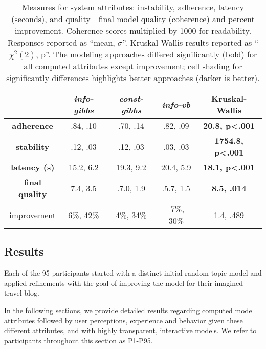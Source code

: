 \begin{table}[t]
  \caption{Measures for system attributes: instability, adherence, latency (seconds), and quality---final model quality (coherence) and percent improvement. Coherence scores multiplied by 1000 for readability. Responses reported as ``mean, $\sigma$''. Kruskal-Wallis
    results reported as
    ``${\chi}^2(2)$, p''.
        The modeling approaches differed significantly (bold) for all computed attributes except improvement; cell shading for significantly differences highlights better approaches (darker is better).}
  \label{tab:attributes}
  \scriptsize
    \begin{center}
    \small
      \begin{tabular}{c c c c c }
        \hline
        & \textit{info-gibbs} & \textit{const-gibbs} & \textit{info-vb} & Kruskal-Wallis \\
        \hline \hline
        \textbf{adherence} &  \cellcolor[gray]{0.7}.84, .10  &  \cellcolor[gray]{0.9}.70, .14 & \cellcolor[gray]{0.7}.82, .09 & \textbf{20.8, p<.001} \\
        \textbf{stability} & \cellcolor[gray]{0.9}.12, .03 & \cellcolor[gray]{0.9}.12, .03 & \cellcolor[gray]{0.7}.03, .03 & \textbf{1754.8, p<.001} \\   
        \textbf{latency (s)} & \cellcolor[gray]{0.7}15.2, 6.2 & \cellcolor[gray]{0.9}19.3, 9.2 & \cellcolor[gray]{0.9}20.4, 5.9 & \textbf{18.1, p<.001} \\ 
        \textbf{final quality}  & \cellcolor[gray]{0.7}7.4, 3.5 & \cellcolor[gray]{0.7}.7.0, 1.9 & \cellcolor[gray]{0.9}.5.7, 1.5 & \textbf{8.5, .014} \\ 
        improvement & 6\%, 42\% & 4\%, 34\% & -7\%, 30\% & 1.4, .489 \\
        \hline
      \end{tabular}
    \end{center}
    \bigskip\centering
\end{table}



\subsection{Results}

Each of the 95 participants started with a distinct initial random topic model
and applied refinements with the
goal of improving the model for their imagined travel blog. 


In the following sections, we provide detailed results regarding computed model attributes followed by user perceptions, experience and behavior given these different attributes, and with highly transparent, interactive models. We refer to participants throughout this section as P1-P95.

